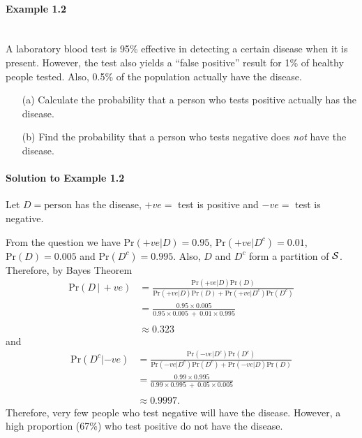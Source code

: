 \paragraph{Example 1.2}{~\\
A laboratory blood test is 95\% effective in detecting a certain
disease when it is present. However, the test also yields a ``false
positive'' result for 1\% of healthy people tested. Also, 0.5\% of the
population actually have the disease.

\begin{itemize}
\item [(a)] Calculate the probability that a person who tests positive actually has the disease.
\item [(b)] Find the probability that a person who tests negative does \textit{not} have the disease.
\end{itemize}}


\paragraph{Solution to Example 1.2}{
    
    Let $D=\text{person}$ has the disease, $+ve=$ test is positive and $-ve=$ test is negative.  

    From the question
    we have $\text{Pr}(+ve|D)=0.95$, $\text{Pr}(+ve|D^c)=0.01$, $\text{Pr}(D)=0.005$ and
    $\text{Pr}(D^c)=0.995$.  Also, $D$ and $D^c$ form a partition of ${\cal
    S}$. Therefore, by Bayes Theorem
    \begin{align*}
    \text{Pr}(D\,|\, +ve) &=\frac{\text{Pr}(+ve|D)\text{Pr}(D)}{\text{Pr}(+ve|D)\text{Pr}(D)+\text{Pr}(+ve|D^c)\text{Pr}(D^c)} \\
    &=\frac{0.95\times 0.005}{0.95\times 0.005~+~0.01\times 0.995} \\ \\
    &\approx 0.323
    \end{align*}
    and
    \begin{align*}
    \text{Pr}(D^c|-ve) &=\frac{\text{Pr}(-ve|D^c)\text{Pr}(D^c)}{\text{Pr}(-ve|D^c)\text{Pr}(D^c)+\text{Pr}(-ve|D)\text{Pr}(D)} \\
    &=\frac{0.99\times 0.995}{0.99\times 0.995~+~0.05\times 0.005} \\ \\
    &\approx 0.9997.
    \end{align*}
    Therefore, very few people who test negative will have the
    disease. However, a high proportion (67\%) who test positive do not
    have the disease.
    
}


